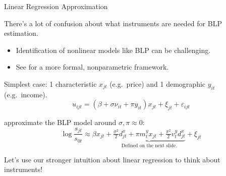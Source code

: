 \documentclass[aspectratio=169,t,11pt,table]{beamer}
\begin{document}
\begin{frame}{Linear Regression Approximation}
    \begin{wideitemize}
        \item There's a lot of confusion about what instruments are needed for BLP estimation.
        \begin{itemize}
            \item Identification of nonlinear models like BLP can be challenging.
            \item See \cite{berry2014identification,berry2024nonparametric} for a more formal, nonparametric framework.
        \end{itemize}
        \pause
        \item Simplest case: 1 characteristic $x_{jt}$ (e.g.\ price) and 1 demographic $y_{it}$ (e.g.\ income).
        \begin{equation*}
            u_{ijt} = (\beta + \sigma \nu_{it} + \pi y_{it}) x_{jt} + \xi_{jt} + \varepsilon_{ijt} 
        \end{equation*}
        \vspace{-1.5\baselineskip}
        \pause
        \item \cite{salanie2022fast} approximate the BLP model around $\sigma, \pi \approx 0$:
        \begin{equation*}
            \log\frac{s_{jt}}{s_{0t}} \approx \beta x_{jt} + \underbrace{\tfrac{\sigma^2}{2} d_{jt}^x + \pi m_t^y x_{jt} + \tfrac{\pi^2}{2} v_t^y d_{jt}^x}_{\text{Defined on the next slide.}} + \xi_{jt}
        \end{equation*}
        \vspace{-1.5\baselineskip}
        \pause
        \item Let's use our stronger intuition about linear regression to think about instruments!
    \end{wideitemize}
\end{frame}
\end{document}
